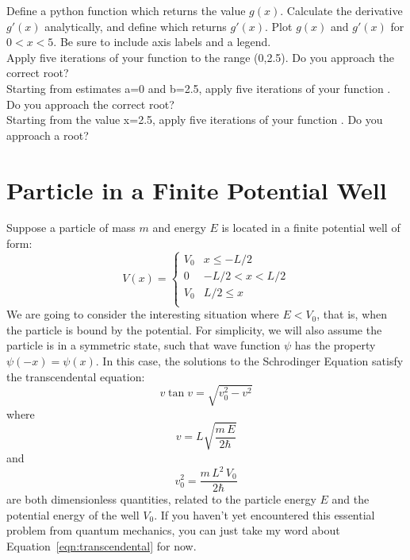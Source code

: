 \plot Define a python function  which returns the value
$g(x)$.  Calculate the derivative $g'(x)$ analytically, and define
 which returns $g'(x)$.  Plot $g(x)$ and $g'(x)$ for
$0<x<5$.  Be sure to include axis labels and a legend. \\

\plot Apply five iterations of your function  to the range (0,2.5).  Do you approach the correct root?   \\

\plot  Starting from estimates a=0 and b=2.5, apply five iterations of your function .  Do you approach the correct root? \\


\plot Starting from the value x=2.5, apply five iterations of your function .  Do you approach a root? \\

\section{Particle in a Finite Potential Well}
\label{sec:pbox}

Suppose a particle of mass $m$ and energy $E$ is located in a finite potential well of form:
\begin{displaymath}
  V(x) =
  \begin{cases}
    V_0 & x \leq -L/2 \\
    0 & -L/2 < x < L/2 \\
    V_0 & L/2 \leq x \\
   \end{cases}
\end{displaymath}
We are going to consider the interesting situation where $E<V_0$, that
is, when the particle is bound by the potential.  For simplicity, we
will also assume the particle is in a symmetric state, such that wave
function $\psi$ has the property $\psi(-x)=\psi(x)$.  In this case, the
solutions to the Schrodinger Equation satisfy the transcendental
equation:
\begin{equation}
\label{eqn:transcendental}
v \tan v = \sqrt{v_0^2 - v^2}
\end{equation}
where 
\begin{displaymath}
v = L \sqrt{\frac{m \, E }{2 \hbar}}
\end{displaymath}
and
\begin{displaymath}
v_0^2 = \frac{m \, L^2 \, V_0}{2 \hbar} 
\end{displaymath}
are both dimensionless quantities, related to the particle energy $E$
and the potential energy of the well $V_0$.  If you haven't
yet encountered this essential problem from quantum mechanics, you can
just take my word about Equation~\ref{eqn:transcendental} for now.

